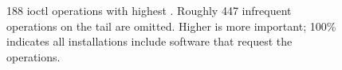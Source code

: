 




\begin{figure}[t]
\vspace{-0.1in}
\caption{188 {ioctl} operations with highest \usagemetric{}.  Roughly 447 infrequent operations on the tail are omitted. Higher is more important; 100\% indicates all installations include software that request the operations.}
\label{fig:ioctl-popularity}
\end{figure}

